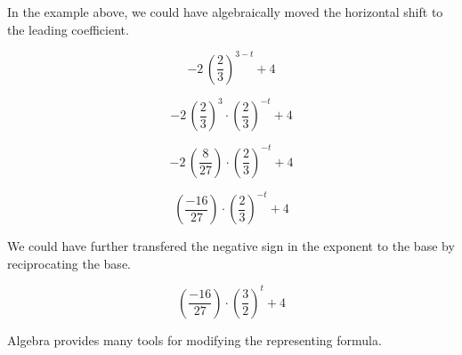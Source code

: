 \documentclass{ximera}
\begin{document}
In the example above, we could have algebraically moved the horizontal shift to the leading coefficient.



\[
-2 \, \left( \frac{2}{3} \right)^{3-t} + 4
\]


\[
-2 \, \left( \frac{2}{3} \right)^{3} \cdot \left( \frac{2}{3} \right)^{-t}+ 4
\]


\[
-2 \, \left( \frac{8}{27} \right)  \cdot \left( \frac{2}{3} \right)^{-t}+ 4
\]


\[
\left( \frac{-16}{27} \right)  \cdot \left( \frac{2}{3} \right)^{-t}+ 4
\]


We could have further transfered the negative sign in the exponent to the base by reciprocating the base.

\[
\left( \frac{-16}{27} \right)  \cdot \left( \frac{3}{2} \right)^t+ 4
\]



Algebra provides many tools for modifying the representing formula. \\
\end{document}
